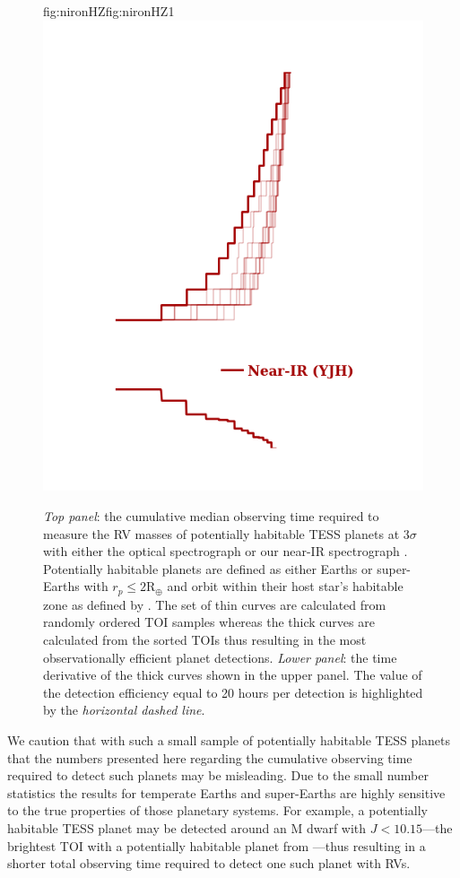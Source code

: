 \begin{figure}
  \begin{ocg}{fig:nironHZ}{fig:nironHZ}{1}%
  \includegraphics[width=0.6\hsize]{figures/cumulativetobsGP_HZ_nir.png}%
  \end{ocg}
  \hspace{-0.6\hsize}%
  \caption[Cumulative mean observing times to measure RV masses of potentially habitable planets transiting TOIs.]
          {\small \emph{Top panel}: the cumulative median observing time required to measure the RV masses of
    potentially habitable TESS planets at $3\sigma$ with either the optical spectrograph
     or our
    near-IR spectrograph 
    .
    Potentially habitable planets are defined as either Earths or super-Earths with
    $r_p \leq 2 \text{R}_{\oplus}$ and orbit within their host star's habitable zone as
    defined by \citep{kopparapu13}. The set of 
    thin curves are calculated from randomly ordered TOI samples whereas the thick curves are
    calculated from the sorted TOIs thus resulting in the most observationally efficient planet
    detections. \emph{Lower panel}: the time derivative of the thick curves shown in the upper panel.
    The value of the detection efficiency equal to 20 hours per detection is highlighted
    by the \emph{horizontal dashed line}.}
  \label{RVFCfig:cumulativeHZ}
\end{figure}

We caution that with such a small sample of potentially habitable TESS planets that
the numbers presented here regarding the cumulative observing time required to detect such
planets may be misleading. Due to the small number statistics the results
for temperate Earths and super-Earths are highly sensitive to the
true properties of those planetary systems. For example, a potentially
habitable TESS planet may be detected around an M dwarf with $J<10.15$---the brightest TOI with
a potentially habitable planet from ---thus resulting in a shorter total
observing time required to detect one such planet with RVs.


